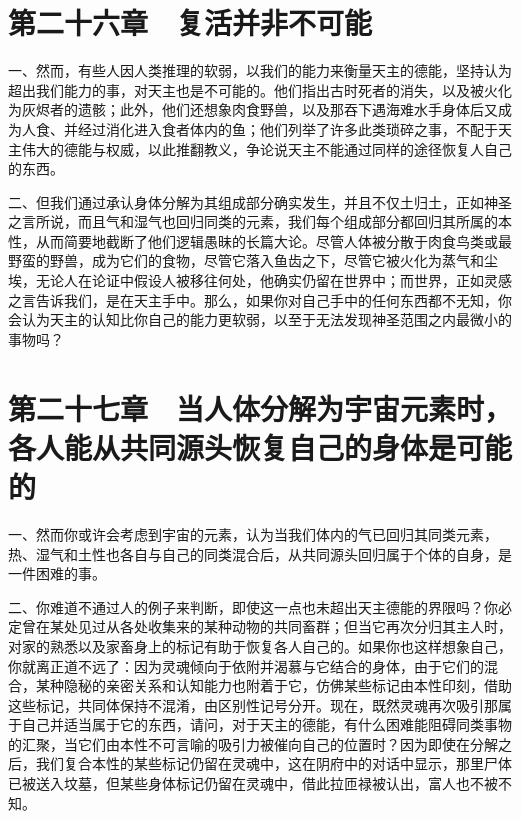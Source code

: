 
\section{第二十六章　复活并非不可能}

一、然而，有些人因人类推理的软弱，以我们的能力来衡量天主的德能，坚持认为超出我们能力的事，对天主也是不可能的。他们指出古时死者的消失，以及被火化为灰烬者的遗骸；此外，他们还想象肉食野兽，以及那吞下遇海难水手身体后又成为人食、并经过消化进入食者体内的鱼；他们列举了许多此类琐碎之事，不配于天主伟大的德能与权威，以此推翻教义，争论说天主不能通过同样的途径恢复人自己的东西。\par

二、但我们通过承认身体分解为其组成部分确实发生，并且不仅土归土，正如神圣之言所说，而且气和湿气也回归同类的元素，我们每个组成部分都回归其所属的本性，从而简要地截断了他们逻辑愚昧的长篇大论。尽管人体被分散于肉食鸟类或最野蛮的野兽，成为它们的食物，尽管它落入鱼齿之下，尽管它被火化为蒸气和尘埃，无论人在论证中假设人被移往何处，他确实仍留在世界中；而世界，正如灵感之言告诉我们，是在天主手中。那么，如果你对自己手中的任何东西都不无知，你会认为天主的认知比你自己的能力更软弱，以至于无法发现神圣范围之内最微小的事物吗？\par


\section{第二十七章　当人体分解为宇宙元素时，各人能从共同源头恢复自己的身体是可能的}

一、然而你或许会考虑到宇宙的元素，认为当我们体内的气已回归其同类元素，热、湿气和土性也各自与自己的同类混合后，从共同源头回归属于个体的自身，是一件困难的事。\par

二、你难道不通过人的例子来判断，即使这一点也未超出天主德能的界限吗？你必定曾在某处见过从各处收集来的某种动物的共同畜群；但当它再次分归其主人时，对家的熟悉以及家畜身上的标记有助于恢复各人自己的。如果你也这样想象自己，你就离正道不远了：因为灵魂倾向于依附并渴慕与它结合的身体，由于它们的混合，某种隐秘的亲密关系和认知能力也附着于它，仿佛某些标记由本性印刻，借助这些标记，共同体保持不混淆，由区别性记号分开。现在，既然灵魂再次吸引那属于自己并适当属于它的东西，请问，对于天主的德能，有什么困难能阻碍同类事物的汇聚，当它们由本性不可言喻的吸引力被催向自己的位置时？因为即使在分解之后，我们复合本性的某些标记仍留在灵魂中，这在阴府中的对话中显示，那里尸体已被送入坟墓，但某些身体标记仍留在灵魂中，借此拉匝禄被认出，富人也不被不知。\par

